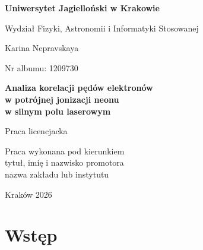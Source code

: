 \documentclass[12pt,letterpaper,oneside]{report}
\numberwithin{equation}{chapter}
\numberwithin{figure}{chapter}
\numberwithin{table}{chapter}
\newcommand{\UniversityName}{Uniwersytet Jagielloński w Krakowie}
\newcommand{\FacultyName}{Wydział Fizyki, Astronomii i Informatyki Stosowanej}
\newcommand{\AuthorName}{Karina Nepravskaya}
\newcommand{\AlbumNumber}{1209730}
\newcommand{\SupervisorName}{tytuł, imię i nazwisko promotora}
\newcommand{\DepartmentName}{nazwa zakładu lub instytutu}
\newcommand{\YearOfSubmission}{2026}
\begin{document}
\begin{titlepage}
\thispagestyle{empty}

\noindent
{\bfseries \UniversityName}\par
\noindent
\FacultyName

\vspace{2.7cm}

\begin{center}
\LARGE \AuthorName

\vspace{0.35cm}
{\large Nr albumu: \AlbumNumber}
\end{center}

\vspace{2.0cm}

\begin{center}
{\LARGE\bfseries
Analiza korelacji pędów elektronów\\[0.2em]
w potrójnej jonizacji neonu\\[0.2em]
w silnym polu laserowym\par}

\vspace{1.2cm}

{\normalsize Praca licencjacka}
\end{center}

\vfill

\begin{flushright}
\begin{minipage}{0.48\textwidth}
\raggedleft
Praca wykonana pod kierunkiem\\
\SupervisorName\\
\DepartmentName
\end{minipage}
\end{flushright}

\vfill

\begin{center}
Kraków \YearOfSubmission
\end{center}
\end{titlepage}

\setcounter{page}{2}
\tableofcontents
\clearpage

\chapter{Wstęp}
\end{document}
